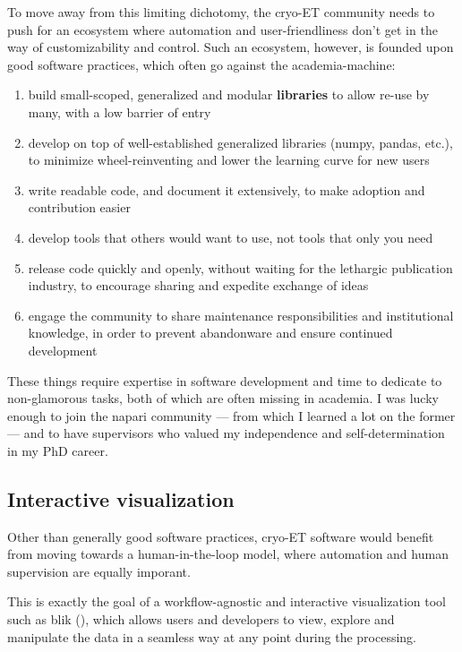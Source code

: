 To move away from this limiting dichotomy, the cryo-ET community needs to push for an ecosystem where automation and user-friendliness don't get in the way of customizability and control.
Such an ecosystem, however, is founded upon good software practices, which often go against the academia-machine:

\begin{enumerate}[noitemsep]
    \item build small-scoped, generalized and modular \textbf{libraries} to allow re-use by many, with a low barrier of entry
    \item develop on top of well-established generalized libraries (numpy, pandas, etc.), to minimize wheel-reinventing and lower the learning curve for new users
    \item write readable code, and document it extensively, to make adoption and contribution easier
    \item develop tools that others would want to use, not tools that only you need
    \item release code quickly and openly, without waiting for the lethargic publication industry, to encourage sharing and expedite exchange of ideas
    \item engage the community to share maintenance responsibilities and institutional knowledge, in order to prevent abandonware and ensure continued development
\end{enumerate}

These things require expertise in software development and time to dedicate to non-glamorous tasks, both of which are often missing in academia.
I was lucky enough to join the napari community --- from which I learned a lot on the former --- and to have supervisors who valued my independence and self-determination in my PhD career.

\subsection{Interactive visualization}

Other than generally good software practices, cryo-ET software would benefit from moving towards a human-in-the-loop model, where automation and human supervision are equally imporant.

This is exactly the goal of a workflow-agnostic and interactive visualization tool such as blik (), which allows users and developers to view, explore and manipulate the data in a seamless way at any point during the processing.


